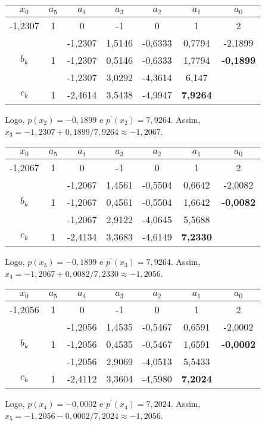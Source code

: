 \documentclass[12pt,a4paper]{article}
\begin{document}
\begin{ExerciseList}
\begin{center}
\begin{tabular}{|c|c|c|c|c|c|c|}
\hline
$x_0$ & $a_5$ & $a_4$ & $a_3$ & $a_2$ & $a_1$ & $a_0$ \\
\hline
-1,2307 & 1 & 0 & -1 & 0 & 1 & 2 \\
\hline
 &   & -1,2307 & 1,5146 & -0,6333 & 0,7794 & -2,1899 \\
\hline
$b_k$ & 1 & -1,2307 & 0,5146 & -0,6333 & 1,7794 & \textbf{-0,1899} \\
\hline
 &   & -1,2307 & 3,0292 & -4,3614 & 6,147 & \\
\hline
$c_k$ & 1 & -2,4614 & 3,5438 & -4,9947 & \textbf{7,9264} & \\
\hline
\end{tabular}
\end{center}
Logo, $p(x_2) = -0,1899$ e $p^\prime(x_2) = 7,9264$. Assim,
$x_3 = -1,2307 + 0,1899/7,9264 \approx -1,2067$.

\begin{center}
\begin{tabular}{|c|c|c|c|c|c|c|}
\hline
$x_0$ & $a_5$ & $a_4$ & $a_3$ & $a_2$ & $a_1$ & $a_0$ \\
\hline
-1,2067 & 1 & 0 & -1 & 0 & 1 & 2\\
\hline
&  & -1,2067 & 1,4561 & -0,5504 & 0,6642 & -2,0082\\
\hline
$b_k$ & 1 & -1,2067 & 0,4561 & -0,5504 & 1,6642 & \textbf{-0,0082} \\
\hline
&  & -1,2067 & 2,9122 & -4,0645 & 5,5688 & \\
\hline
$c_k$ & 1 & -2,4134 & 3,3683 & -4,6149 & \textbf{7,2330} & \\
\hline
\end{tabular}
\end{center}
Logo, $p(x_3) = -0,1899$ e $p^\prime(x_3) = 7,9264$. Assim,
$x_4 = -1,2067 + 0,0082/7,2330 \approx -1,2056$.

\begin{center}
\begin{tabular}{|c|c|c|c|c|c|c|}
\hline
$x_0$ & $a_5$ & $a_4$ & $a_3$ & $a_2$ & $a_1$ & $a_0$ \\
\hline
-1,2056 & 1 & 0 & -1 & 0 & 1 & 2\\
\hline
&  & -1,2056 & 1,4535 & -0,5467 & 0,6591 & -2,0002 \\
\hline
$b_k$ & 1 & -1,2056 & 0,4535 & -0,5467 & 1,6591 & \textbf{-0,0002} \\
\hline
&  & -1,2056 & 2,9069 & -4,0513 & 5,5433 &   \\
\hline
$c_k$ & 1 & -2,4112 & 3,3604 & -4,5980 & \textbf{7,2024} &   \\
\hline
\end{tabular}
\end{center}
Logo, $p(x_4) = -0,0002$ e $p^\prime(x_4) = 7,2024$. Assim,
$x_5 = -1,2056 - 0,0002/7,2024 \approx -1,2056$.


\end{ExerciseList}
\end{document}
